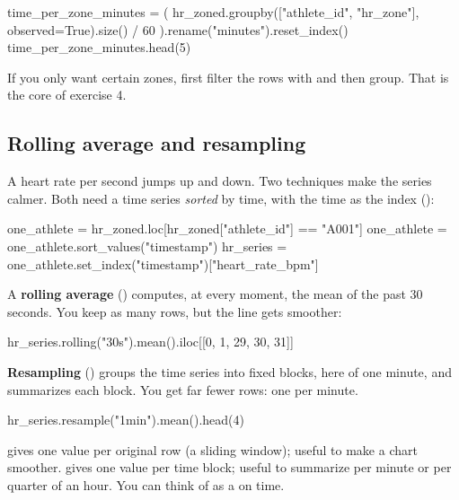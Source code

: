 \documentclass[11pt,a4paper]{article}
\begin{document}
\begin{python}
time_per_zone_minutes = (
    hr_zoned.groupby(["athlete_id", "hr_zone"], observed=True).size() / 60
).rename("minutes").reset_index()
time_per_zone_minutes.head(5)
\end{python}

If you only want certain zones, first filter the rows with
 and then group. That is the core of exercise 4.

\subsection{Rolling average and resampling}

A heart rate per second jumps up and down. Two techniques make the
series calmer. Both need a time series \emph{sorted} by time, with the
time as the index ():

\begin{python}[noout]
one_athlete = hr_zoned.loc[hr_zoned["athlete_id"] == "A001"]
one_athlete = one_athlete.sort_values("timestamp")
hr_series = one_athlete.set_index("timestamp")["heart_rate_bpm"]
\end{python}

A \textbf{rolling average} () computes, at every moment,
the mean of the past 30 seconds. You keep as many rows, but the line
gets smoother:

\begin{python}
hr_series.rolling("30s").mean().iloc[[0, 1, 29, 30, 31]]
\end{python}

\textbf{Resampling} () groups the time series into fixed
blocks, here of one minute, and summarizes each block. You get far fewer
rows: one per minute.

\begin{python}
hr_series.resample("1min").mean().head(4)
\end{python}

\begin{keyidea}
 gives one value per original row (a sliding window);
useful to make a chart smoother.  gives one value per
time block; useful to summarize per minute or per quarter of an hour.
You can think of  as a  on time.
\end{keyidea}

\end{document}
